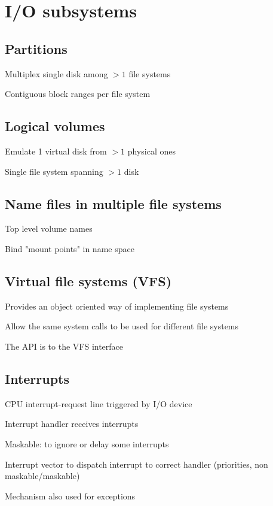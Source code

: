 \section{I/O subsystems}

\subsection{Partitions}
\enumstart
	\item Multiplex single disk among $>1$ file systems
	\item Contiguous block ranges per file system
\enumend

\subsection{Logical volumes}
\enumstart
	\item Emulate 1 virtual disk from $>1$ physical ones
	\item Single file system spanning $>1$ disk
\enumend

\subsection{Name files in multiple file systems}
\enumstart
	\item Top level volume names
	\item Bind "mount points" in name space
\enumend

\subsection{Virtual file systems (VFS)}
\enumstart
	\item Provides an object oriented way of implementing file systems
	\item Allow the same system calls to be used for different file systems
	\item The API is to the VFS interface
\enumend

\subsection{Interrupts}
\enumstart
	\item CPU interrupt-request line triggered by I/O device
	\item Interrupt handler receives interrupts
	\item Maskable: to ignore or delay some interrupts
	\item Interrupt vector to dispatch interrupt to correct handler (priorities, non maskable/maskable)
	\item Mechanism also used for exceptions
\enumend

